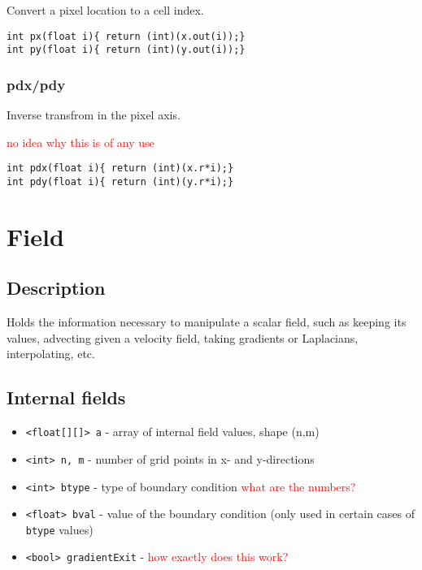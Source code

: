 \documentclass[notitlepage]{article}
\begin{document}
Convert a pixel location to a cell index.

\begin{lstlisting}[style=myCpp]
int px(float i){ return (int)(x.out(i));}
int py(float i){ return (int)(y.out(i));}
\end{lstlisting}

\subsubsection{pdx/pdy}

Inverse transfrom in the pixel axis.

\textcolor{red}{no idea why this is of any use}
\begin{lstlisting}[style=myCpp]
int pdx(float i){ return (int)(x.r*i);}
int pdy(float i){ return (int)(y.r*i);}
\end{lstlisting}

\section{Field}

\subsection{Description}

Holds the information necessary to manipulate a scalar field,
such as keeping its values, advecting given a velocity field,
taking gradients or Laplacians, interpolating, etc.

\subsection{Internal fields}

\begin{itemize}
\item \texttt{<float[][]> a} - array of internal field values, shape (n,m)
\item \texttt{<int> n, m} - number of grid points in x- and y-directions
\item \texttt{<int> btype} - type of boundary condition \textcolor{red}{what are the numbers?}
\item \texttt{<float> bval} - value of the boundary condition (only used in certain cases of \texttt{btype} values)
\item \texttt{<bool> gradientExit} - \textcolor{red}{how exactly does this work?}
\end{itemize}
\end{document}
